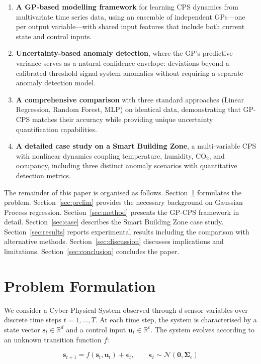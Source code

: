 \documentclass[conference]{IEEEtran}
\begin{document}
\begin{enumerate}
\item \textbf{A GP-based modelling framework} for learning CPS dynamics from multivariate time series data, using an ensemble of independent GPs---one per output variable---with shared input features that include both current state and control inputs.
\item \textbf{Uncertainty-based anomaly detection}, where the GP's predictive variance serves as a natural confidence envelope: deviations beyond a calibrated threshold signal system anomalies without requiring a separate anomaly detection model.
\item \textbf{A comprehensive comparison} with three standard approaches (Linear Regression, Random Forest, MLP) on identical data, demonstrating that GP-CPS matches their accuracy while providing unique uncertainty quantification capabilities.
\item \textbf{A detailed case study on a Smart Building Zone}, a multi-variable CPS with nonlinear dynamics coupling temperature, humidity, CO$_2$, and occupancy, including three distinct anomaly scenarios with quantitative detection metrics.
\end{enumerate}

The remainder of this paper is organised as follows. Section~\ref{sec:problem} formulates the problem. Section~\ref{sec:prelim} provides the necessary background on Gaussian Process regression. Section~\ref{sec:method} presents the GP-CPS framework in detail. Section~\ref{sec:case} describes the Smart Building Zone case study. Section~\ref{sec:results} reports experimental results including the comparison with alternative methods. Section~\ref{sec:discussion} discusses implications and limitations. Section~\ref{sec:conclusion} concludes the paper.

\section{Problem Formulation}
\label{sec:problem}

We consider a Cyber-Physical System observed through $d$ sensor variables over discrete time steps $t = 1, \dots, T$. At each time step, the system is characterised by a state vector $\mathbf{s}_t \in \mathbb{R}^d$ and a control input $\mathbf{u}_t \in \mathbb{R}^c$. The system evolves according to an unknown transition function $f$:

\begin{equation}
\mathbf{s}_{t+1} = f(\mathbf{s}_t, \mathbf{u}_t) + \boldsymbol{\epsilon}_t,
\qquad \boldsymbol{\epsilon}_t \sim \mathcal{N}(\mathbf{0}, \boldsymbol{\Sigma}_\epsilon)
\label{eq:transition}
\end{equation}
\end{document}
